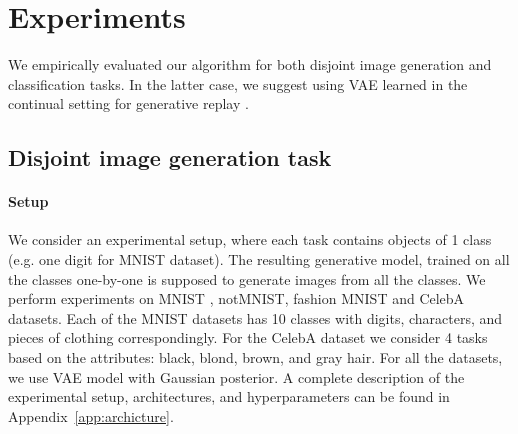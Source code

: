 \section{Experiments}
\label{exper}
We empirically evaluated our algorithm for both disjoint image generation and classification tasks. In the latter case, we suggest using VAE learned in the continual setting for generative replay \citep{shin2017continual}. 

\subsection{Disjoint image generation task}
\paragraph{Setup} We consider an experimental setup, where each task contains objects of 1 class (e.g. one digit for MNIST dataset). The resulting generative model, trained on all the classes one-by-one is supposed to generate images from all the classes. We perform experiments on MNIST \citep{lecun1998mnist} , notMNIST, fashion MNIST \citep{xiao2017fashion}  and CelebA \citep{liu2015faceattributes} datasets. Each of the MNIST datasets has 10 classes with digits, characters, and pieces of clothing correspondingly. For the CelebA dataset we consider 4 tasks based on the attributes: black, blond, brown, and gray hair. For all the datasets, we use VAE \citep{kingma2014autoencoding} model with Gaussian posterior. A complete description of the experimental setup, architectures, and hyperparameters can be found in Appendix~\ref{app:archicture}. 

